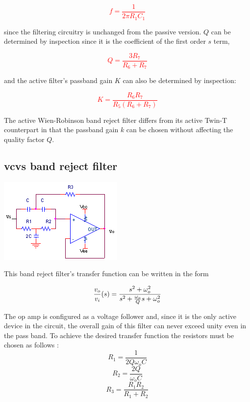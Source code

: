 \textcolor{red}{
\begin{equation}
f = \frac{1}{2\pi R_1 C_1}
\end{equation}
}

since the filtering circuitry is unchanged from the passive version.
$Q$ can be determined by inspection since it is the coefficient of the first order $s$ term,

\textcolor{red}{
\begin{equation}
Q = \frac{3R_7}{R_6 + R_7}
\end{equation}
}

and the active filter's passband gain $K$ can also be determined by inspection:

\textcolor{red}{
\begin{equation}
K = \frac{R_6 R_7}{R_5(R_6 + R_7)}
\end{equation}
}

The active Wien-Robinson band reject filter differs from its active Twin-T counterpart in that the passband gain $k$ can be chosen without affecting the quality factor $Q$.

\subsection{\ac{vcvs} band reject filter}
\begin{center}
	\includegraphics{schematics/vcvs_bandreject.PNG}
\end{center}
This band reject filter's transfer function can be written in the form

\textcolor{red}{
\begin{equation}
\frac{\vout}{\vin}(s) = \frac{s^2 + \omega_{o}^2}{s^2 + \frac{\omega_{o}}{Q}s + \omega_{o}^2}
\label{eq:vcvs_bandreject}
\end{equation}
}

The op amp is configured as a voltage follower and, since it is the only active device in the circuit, the overall gain of this filter can never exceed unity even in the pass band.
To achieve the desired transfer function the resistors must be chosen as follows \autocite[145-146]{op-amp-circuits-johnson}:
\begin{equation}
R_1 = \frac{1}{2Q\omega_{o}C}
\end{equation}
\begin{equation}
R_2 = \frac{2Q}{\omega_{o}C}
\end{equation}
\begin{equation}
R_3 = \frac{R_1 R_2}{R_1 + R_2}
\end{equation}

